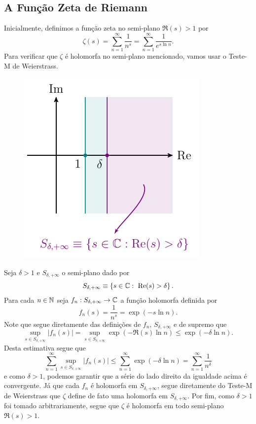     
    \subsection{A Função Zeta de Riemann}
    \begin{center}
    \end{center}
    Inicialmente, definimos a função zeta no semi-plano $\Re(s) > 1$
    por
    \[
    \zeta(s) = \sum_{n=1}^{\infty} \frac{1}{n^s} 
             = \sum_{n=1}^{\infty} \frac{1}{e^{s\ln n}}.
    \]
    Para verificar que $\zeta$ é holomorfa no semi-plano mencionado,
    vamos usar o Teste-M de Weierstrass.
    \begin{figure}[H]\centering
        \includegraphics{Figuras/S delta infinito.pdf}
    \end{figure}
    Seja $\delta>1$ e $S_{\delta, +\infty}$  
    o semi-plano dado por
    \[
    S_{\delta, +\infty} 
    \equiv 
    \left\{ s\in\mathbb{C} :\ \mathrm{Re}(s) > \delta \right\}.
    \]
    Para cada $n\in\mathbb{N}$ seja  
    $f_n: S_{\delta, +\infty}\to\mathbb{C}$
    a função holomorfa definida por
    \[
    f_n(s) = \frac{1}{n^s} = \exp(-s\ln n).
    \]
    Note que segue diretamente das definições 
    de $f_n$, $S_{\delta, +\infty}$ e de supremo que
    \[
    \sup_{s\in S_{\delta,+\infty}} |f_n(s)| 
    = 
    \sup_{s\in S_{\delta,+\infty}}
    \exp(-\Re(s)\ln n) 
    \leq 
    \exp(-\delta\ln n).
    \]
    Desta estimativa segue que 
    \[
    \sum_{n=1}^{\infty} 
    \sup_{s\in S_{\delta,+\infty}}|f_n(s)|
    \leq 
    \sum_{n=1}^{\infty} \exp(-\delta\ln n)
    = 
    \sum_{n=1}^{\infty} \frac{1}{n^\delta}
    \]
    e como $\delta > 1$, podemos garantir que 
    a série do lado direito da igualdade acima é convergente.
    Já que cada $f_n$ é holomorfa em $S_{\delta, +\infty}$, segue
    diretamente do Teste-M de Weierstrass que $\zeta$ define de fato uma holomorfa em
    $S_{\delta,+\infty}$. 
    Por fim,
    como $\delta > 1$ foi tomado arbitrariamente, segue que
    $\zeta$ é holomorfa em todo semi-plano $\Re(s) > 1$.
    
